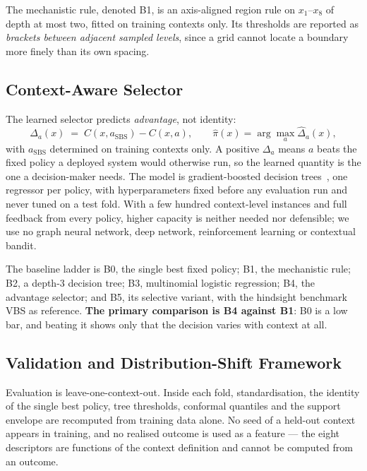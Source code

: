 \documentclass[runningheads]{llncs}
\begin{document}
The mechanistic rule, denoted B1, is an axis-aligned region rule on
$x_1$--$x_8$ of depth at most two, fitted on training contexts only. Its
thresholds are reported as \emph{brackets between adjacent sampled levels},
since a grid cannot locate a boundary more finely than its own spacing.

\subsection{Context-Aware Selector}

The learned selector predicts \emph{advantage}, not identity:
\begin{equation}
\Delta_a(x) \;=\; C(x, a_{\mathrm{SBS}}) - C(x,a),
\qquad \hat{\pi}(x) = \arg\max_a \hat{\Delta}_a(x),
\label{eq:advantage}
\end{equation}
with $a_{\mathrm{SBS}}$ determined on training contexts only. A positive
$\Delta_a$ means $a$ beats the fixed policy a deployed system would otherwise
run, so the learned quantity is the one a decision-maker needs. The model is
gradient-boosted decision trees~\cite{friedman2001gbm,ke2017lightgbm}, one
regressor per policy, with hyperparameters fixed before any evaluation run and
never tuned on a test fold. With a few hundred context-level instances and full
feedback from every policy, higher capacity is neither needed nor defensible;
we use no graph neural network, deep network, reinforcement learning or
contextual bandit.

The baseline ladder is B0, the single best fixed policy; B1, the mechanistic
rule; B2, a depth-3 decision tree; B3, multinomial logistic regression; B4, the
advantage selector; and B5, its selective variant, with the hindsight benchmark
VBS as reference. \textbf{The primary comparison is B4 against B1}: B0 is a low
bar, and beating it shows only that the decision varies with context at all.

\subsection{Validation and Distribution-Shift Framework}

Evaluation is leave-one-context-out. Inside each fold, standardisation, the
identity of the single best policy, tree thresholds, conformal quantiles and
the support envelope are recomputed from training data alone. No seed of a
held-out context appears in training, and no realised outcome is used as a
feature --- the eight descriptors are functions of the context definition and
cannot be computed from an outcome.
\end{document}
